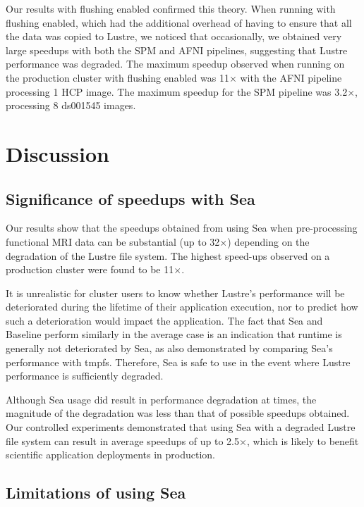 \documentclass[fleqn,10pt]{wlscirep}
\begin{document}
  Our results with flushing enabled confirmed this theory. When running with
  flushing enabled, which had the additional overhead of having to
  ensure that all the data was copied to Lustre, we noticed that occasionally, we
  obtained very large speedups with both the SPM and AFNI pipelines, suggesting that Lustre
  performance was degraded. The
  maximum speedup observed when running on the production cluster with flushing enabled was
  11$\times$ with the AFNI pipeline processing 1 HCP image. The maximum speedup for the SPM pipeline was
  3.2$\times$, processing 8 ds001545 images.

    
    \section{Discussion}
    \subsection{Significance of speedups with Sea}

    Our results show that the speedups obtained from using Sea when pre-processing functional MRI data can be 
    substantial (up to 32$\times$) depending on the degradation of the Lustre
    file system. The highest speed-ups observed on a production cluster were
    found to be 11$\times$.

    It is unrealistic for cluster users to know whether Lustre's
    performance will be deteriorated during the lifetime of their application
    execution, nor to predict how such a deterioration would impact the
    application. The fact that Sea and Baseline perform similarly in the average
    case is an indication that runtime is generally not deteriorated by Sea, as
    also demonstrated by comparing Sea's performance with tmpfs. Therefore, Sea
    is safe to use in the event where Lustre performance is sufficiently
    degraded.

    Although Sea usage did result in performance degradation at times, the magnitude
    of the degradation was less than that of possible speedups
    obtained. Our controlled experiments demonstrated that using Sea with a
    degraded Lustre file system can result in average speedups of up to
    2.5$\times$, which is likely to benefit scientific application deployments in production.

    \subsection{Limitations of using Sea}
    
\end{document}
